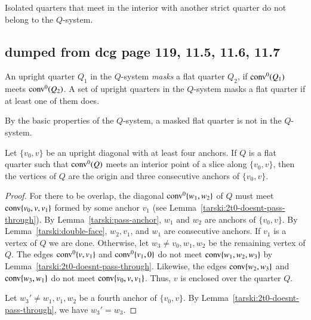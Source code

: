 Isolated quarters that meet in the interior with another strict
quarter do not belong to the $Q$-system.



\newpage

\subsection{dumped from dcg page 119, 11.5, 11.6, 11.7}



\begin{definition}[mask]
An upright quarter $Q_1$ in the $Q$-system
{\it masks} a flat quarter $Q_2$, if
${\operatorname{conv}}^0(Q_1)$ meets ${\operatorname{conv}}^0(Q_2)$.   A set of upright
quarters in the $Q$-system masks a flat quarter if at least 
one of them does.
\end{definition}

By the basic properties of the $Q$-system, a masked flat quarter is
not in the $Q$-system.

\begin{lemma}
Let $\{v_0,v\}$ be an upright diagonal with at least four anchors.
If $Q$ is a flat quarter such that ${\operatorname{conv}}^0(Q)$  meets  
an interior point of 
a slice along $\{v_0,v\}$, then the vertices of $Q$ are the
origin and three consecutive anchors of $\{v_0,v\}$.
\end{lemma}

\begin{proof}
For there to be overlap, the diagonal ${\operatorname{conv}}^0\{w_1,w_2\}$ of $Q$ 
must meet
 ${\operatorname{conv}}\{v_0,v,v_1\}$ formed by some anchor $v_1$  (see
Lemma~\ref{tarski:2t0-doesnt-pass-through}).  By
Lemma~\ref{tarski:pass-anchor}, $w_1$ and $w_2$ are anchors of
$\{v_0,v\}$. By Lemma~\ref{tarski:double-face}, $w_2,v_1$, and $w_1$
are consecutive anchors. If $v_1$ is a vertex of $Q$ we are done.
Otherwise, let $w_3\ne v_0,w_1,w_2$ be the remaining vertex of $Q$.
The edges ${\operatorname{conv}}^0\{v,v_1\}$ and ${\operatorname{conv}}^0\{v_1,0\}$ do not
meet
${\operatorname{conv}}\{w_1,w_2,w_3\}$ by Lemma~\ref{tarski:2t0-doesnt-pass-through}.
Likewise, the edges ${\operatorname{conv}}\{w_2,w_3\}$ and ${\operatorname{conv}}\{w_3,w_1\}$ 
do not meet
 ${\operatorname{conv}}\{v_0,v,v_1\}$. Thus, $v$ is enclosed over the
quarter $Q$.

Let $w_3'\ne w_1,v_1,w_2$ be a fourth anchor of $\{v_0,v\}$. By
Lemma~\ref{tarski:2t0-doesnt-pass-through}, we have $w_3'=w_3$.
\end{proof}

